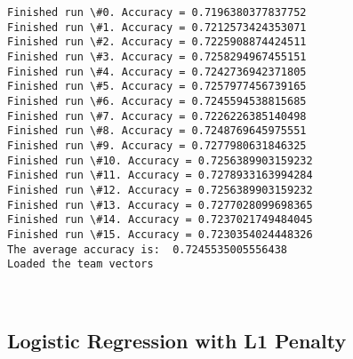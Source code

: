 \documentclass[11pt]{article}
\begin{document}
    \begin{Verbatim}[commandchars=\\\{\}]
Finished run \#0. Accuracy = 0.7196380377837752
Finished run \#1. Accuracy = 0.7212573424353071
Finished run \#2. Accuracy = 0.7225908874424511
Finished run \#3. Accuracy = 0.7258294967455151
Finished run \#4. Accuracy = 0.7242736942371805
Finished run \#5. Accuracy = 0.7257977456739165
Finished run \#6. Accuracy = 0.7245594538815685
Finished run \#7. Accuracy = 0.7226226385140498
Finished run \#8. Accuracy = 0.7248769645975551
Finished run \#9. Accuracy = 0.7277980631846325
Finished run \#10. Accuracy = 0.7256389903159232
Finished run \#11. Accuracy = 0.7278933163994284
Finished run \#12. Accuracy = 0.7256389903159232
Finished run \#13. Accuracy = 0.7277028099698365
Finished run \#14. Accuracy = 0.7237021749484045
Finished run \#15. Accuracy = 0.7230354024448326
The average accuracy is:  0.7245535005556438
Loaded the team vectors

    \end{Verbatim}

    \begin{center}
    \end{center}
    { \hspace*{\fill} \\}
    
    \hypertarget{logistic-regression-with-l1-penalty}{%
\subsection{Logistic Regression with L1
Penalty}\label{logistic-regression-with-l1-penalty}}
\end{document}
